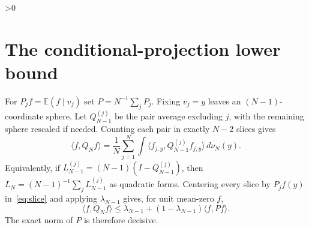 \documentclass[9pt]{extarticle}
\newcommand{\E}{\mathbb E}
\newcommand{\ip}[2]{\langle #1,#2\rangle}
\begin{document}
\ifnum\CRevisionRound>0
\section{The conditional-projection lower bound}
For $P_jf=\E(f\mid v_j)$ set $P=N^{-1}\sum_jP_j$.
Fixing $v_j=y$ leaves an $(N-1)$-coordinate sphere.  Let
$Q_{N-1}^{(j)}$ be the pair average excluding $j$, with the remaining sphere
rescaled if needed.  Counting each pair in exactly $N-2$ slices gives
\begin{equation}\label{eq:slice}
 \ip f{Q_Nf}=\frac1N\sum_{j=1}^N
 \int\ip{f_{j,y}}{Q_{N-1}^{(j)}f_{j,y}}\,d\nu_N(y).
\end{equation}
Equivalently, if $L_{N-1}^{(j)}=(N-1)(I-Q_{N-1}^{(j)})$, then
$L_N=(N-1)^{-1}\sum_jL_{N-1}^{(j)}$ as quadratic forms.
Centering every slice by $P_jf(y)$ in~\eqref{eq:slice} and applying
$\lambda_{N-1}$ gives, for unit mean-zero $f$,
\begin{equation}\label{eq:lambda-induct}
 \ip f{Q_Nf}\leq\lambda_{N-1}+
 (1-\lambda_{N-1})\ip f{Pf}.
\end{equation}
The exact norm of $P$ is therefore decisive.
\end{document}
